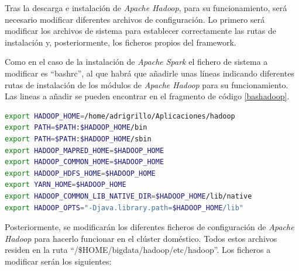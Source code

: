 Tras la descarga e instalación de \textit{Apache Hadoop}, para su funcionamiento, será necesario modificar diferentes archivos de configuración. Lo primero será modificar los archivos de sistema para establecer correctamente las rutas de instalación y, posteriormente, los ficheros propios del \gls{framework}.

Como en el caso de la instalación de \textit{Apache Spark} el fichero de sistema a modificar es ``bashrc'', al que habrá que añadirle unas líneas indicando diferentes rutas de instalación de los módulos de \textit{Apache Hadoop} para su funcionamiento. Las lineas a añadir se pueden encontrar en el fragmento de código \ref{bashadoop}.

\begin{lstlisting}[label=bashadoop,language=sh,frame=single,caption=Líneas a añadir a ``.bashrc'' para el funcionamiento de \textit{Apache hadoop}]
export HADOOP_HOME=/home/adrigrillo/Aplicaciones/hadoop
export PATH=$PATH:$HADOOP_HOME/bin
export PATH=$PATH:$HADOOP_HOME/sbin
export HADOOP_MAPRED_HOME=$HADOOP_HOME
export HADOOP_COMMON_HOME=$HADOOP_HOME
export HADOOP_HDFS_HOME=$HADOOP_HOME
export YARN_HOME=$HADOOP_HOME
export HADOOP_COMMON_LIB_NATIVE_DIR=$HADOOP_HOME/lib/native
export HADOOP_OPTS="-Djava.library.path=$HADOOP_HOME/lib"
\end{lstlisting}

Posteriormente, se modificarán los diferentes ficheros de configuración de \textit{Apache Hadoop} para hacerlo funcionar en el clúster doméstico. Todos estos archivos residen en la ruta ``/\$HOME/bigdata/hadoop/etc/hadoop''. Los ficheros a modificar serán los siguientes:

